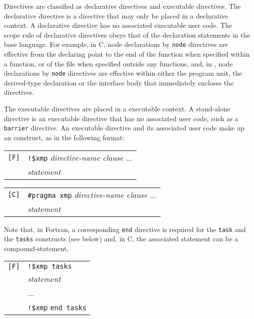 Directives are classified as declarative directives and executable
directives. The declarative directive is a directive that may only be
placed in a declarative context. A declarative directive has no
associated executable user code. The scope rule of declarative
directives obeys that of the declaration statements in the base
language. For example, in C, node declarations by {\tt node} directives
are effective from the declaring point to the end of the function when
specified within a function, or of the file when specified outside any
functions, and, in {\Fort}, node declarations by {\tt node} directives
are effective within either the program unit, the derived-type
declaration or the interface body that immediately encloses the
directives.

The executable directives are placed in a executable context. A
stand-alone directive is an executable directive that has no associated
user code, such as a {\tt barrier} directive.
%
An executable directive and its associated user code make up an
{\XMP} construct, as in the following format:

\vspace{0.5cm}

\begin{tabular}{ll}
\verb![F]! & \verb|!$xmp| {\it directive-name clause} ...\\
 & \hspace{0.5cm} {\it statement} \\
\end{tabular}

\vspace{0.3cm}

\begin{tabular}{ll}
\verb![C]! & \verb|#pragma xmp| {\it directive-name clause} ...\\
 & \hspace{0.5cm} {\it statement} \\
\end{tabular}

\vspace{0.5cm}

Note that, in Fortran, a corresponding {\tt end} directive is required
for the {\tt task} and the {\tt tasks} constructs (see below)
and, in C, the associated statement can be a compound-statement.

\vspace{0.5cm}

\begin{tabular}{ll}
\verb![F]! & \verb|!$xmp tasks| \\
 & \hspace{0.5cm} {\it statement} \\
 & \hspace{0.5cm} ... \\
 & \verb|!$xmp| {\tt end tasks}\\
\end{tabular}





